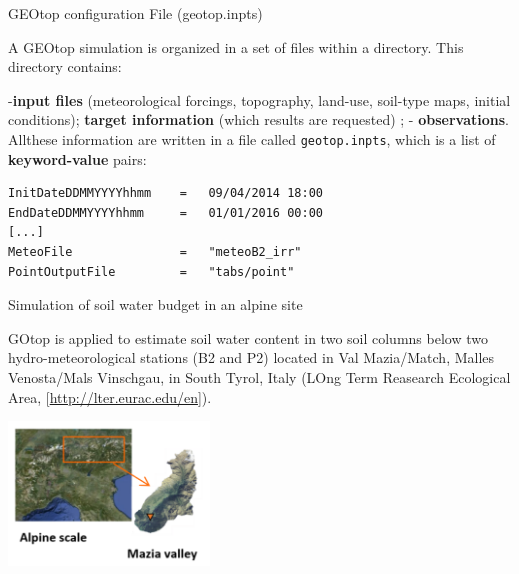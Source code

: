 \documentclass[ignorenonframetext,]{beamer}
\begin{document}
\begin{frame}[fragile]{GEOtop configuration File (geotop.inpts)}
\protect\hypertarget{geotop-configuration-file-geotop.inpts-1}{}

A GEOtop simulation is organized in a set of files within a directory.
This directory contains:

-\textbf{input files} (meteorological forcings, topography, land-use,
soil-type maps, initial conditions); \textbf{target information} (which
results are requested) ; - \textbf{observations}. Allthese information
are written in a file called \texttt{geotop.inpts}, which is a list of
\textbf{keyword-value} pairs:

\begin{verbatim}
InitDateDDMMYYYYhhmm    =   09/04/2014 18:00  
EndDateDDMMYYYYhhmm     =   01/01/2016 00:00 
[...] 
MeteoFile               =   "meteoB2_irr" 
PointOutputFile         =   "tabs/point" 
\end{verbatim}

\end{frame}

\begin{frame}{Simulation of soil water budget in an alpine site}
\protect\hypertarget{simulation-of-soil-water-budget-in-an-alpine-site}{}

GOtop is applied to estimate soil water content in two soil columns
below two hydro-meteorological stations (B2 and P2) located in Val
Mazia/Match, Malles Venosta/Mals Vinschgau, in South Tyrol, Italy (LOng
Term Reasearch Ecological Area, {[}\url{http://lter.eurac.edu/en}{]}).

\includegraphics[width=0.4\textwidth,height=\textheight]{resources/images/mazia_2.png}

\end{frame}
\end{document}
